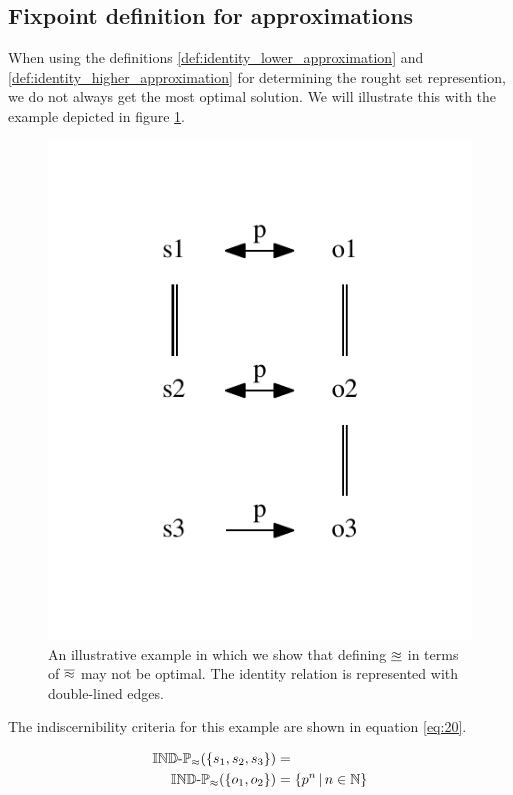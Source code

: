 \subsection{Fixpoint definition for approximations}

When using the definitions
  \ref{def:identity_lower_approximation} and
  \ref{def:identity_higher_approximation}
  for determining the rought set represention,
  we do not always get the most optimal solution.
We will illustrate this with the example depicted
  in figure \ref{fig:fixpoint}.

\begin{figure}
\label{fig:fixpoint}
\centering
\includegraphics{./img/fixpoint_example}%
\caption{
  An illustrative example in which we show that defining
  $\underline{\approx}$ in terms of $\overline{\approx}$ may not be optimal.
  The identity relation is represented with double-lined edges.
}
\end{figure}

The indiscernibility criteria for this example are shown
  in equation \ref{eq:20}.

\begin{align}
\label{eq:20}
  \operatorname{{\mathbb{IND}-\mathbb{P}}}_{\approx}(\{s_1,s_2,s_3\})
&=\\
  \operatorname{{\mathbb{IND}-\mathbb{P}}}_{\approx}(\{o_1,o_2\})
&=
  \{p^n\,\vert\,n \in \mathbb{N}\}\nonumber
\end{align}

